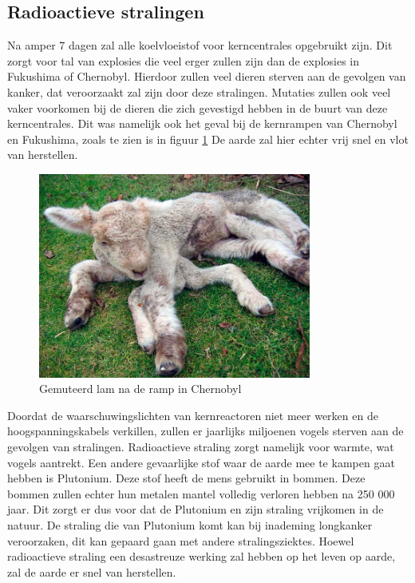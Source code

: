 \subsection{Radioactieve stralingen}
Na amper 7 dagen zal alle koelvloeistof voor kerncentrales opgebruikt zijn. Dit zorgt voor tal van explosies die veel erger zullen zijn dan de explosies in Fukushima of Chernobyl. Hierdoor zullen veel dieren sterven aan de gevolgen van kanker, dat veroorzaakt zal zijn door deze stralingen. Mutaties zullen ook veel vaker voorkomen bij de dieren die zich gevestigd hebben in de buurt van deze kerncentrales. Dit was namelijk ook het geval bij de kernrampen van Chernobyl en Fukushima, zoals te zien is in figuur \ref{fig:mutatielam} De aarde zal hier echter vrij snel en vlot van herstellen.\cite{LAPOutbreak} 
\begin{figure}[h]
	\centering
	\includegraphics[width=0.8\textwidth]{ChernobylLam.jpg}
	\caption{Gemuteerd lam na de ramp in Chernobyl \cite{ChernobylMutations}}
	\label{fig:mutatielam}
\end{figure}
\newline
Doordat de waarschuwingslichten van kernreactoren niet meer werken en de hoogspanningskabels verkillen, zullen er jaarlijks miljoenen vogels sterven aan de gevolgen van stralingen. Radioactieve straling zorgt namelijk voor warmte, wat vogels aantrekt.
\newline
Een andere gevaarlijke stof waar de aarde mee te kampen gaat hebben is Plutonium. Deze stof heeft de mens gebruikt in bommen. Deze bommen zullen echter hun metalen mantel volledig verloren hebben na 250 000 jaar. Dit zorgt er dus voor dat de Plutonium en zijn straling vrijkomen in de natuur. De straling die van Plutonium komt kan bij inademing longkanker veroorzaken, dit kan gepaard gaan met andere stralingsziektes.\cite{WorldWithoutUs}
\newline
Hoewel radioactieve straling een desastreuze werking zal hebben op het leven op aarde, zal de aarde er snel van herstellen. 

